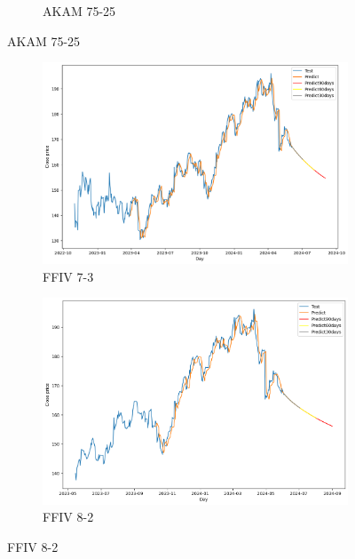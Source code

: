 \documentclass{ieeeojies}
\begin{document}
\begin{figure}[H]
\begin{subfigure}[b]{0.33\linewidth}
        \caption{AKAM 75-25}
        \label{fig:akam-75-25}
    \end{subfigure}
    \vspace{10pt}
\end{figure}
 \vspace{-20pt}
\begin{figure}[H]
    \centering
    \begin{subfigure}[b]{0.33\linewidth}
        \centering
        \includegraphics[width=\linewidth]{GRU Plot/GRU_FFIV_7_3.png}
        \caption{FFIV 7-3}
        \label{fig:ffiv-7-3}
    \end{subfigure}%
    \hfill
    \begin{subfigure}[b]{0.33\linewidth}
        \centering
        \includegraphics[width=\linewidth]{GRU Plot/GRU_FFIV_8_2.png}
        \caption{FFIV 8-2}
        \label{fig:ffiv-8-2}
    \end{subfigure}%

\end{figure}
\end{document}
